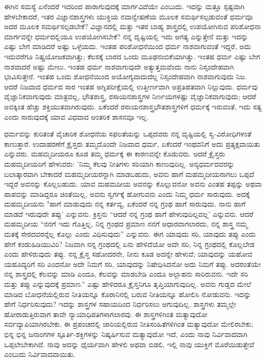 ಈಗಿನ ಸಮಸ್ಯೆ ಏನೆಂದರೆ ಇದರಿಂದ ಪಾರಾಗುವುದಕ್ಕೆ ಮಾರ್ಗವಿದೆಯೇ ಎಂಬುದು. ಇದನ್ನು ಮತ್ತೂ ಸ್ಪಷ್ಟವಾಗಿ ಹೇಳಬೇಕಾದರೆ, ಇತರ ವಿಜ್ಞಾನಶಾಸ್ತ್ರಗಳು ಯುಕ್ತಿಯ ನವಾನ್ವೇಷಣೆಯ ಮೂಲಕ ಸಮರ್ಥಿಸಲ್ಪಡುವಂತೆ ಧರ್ಮವೂ ಅದರ ಮೂಲಕ ಸಮರ್ಥಿಸಲ್ಪಡಬೇಕೆ? ವಿಜ್ಞಾನದಲ್ಲಿ ಮತ್ತು ಇತರ ಬಾಹ್ಯ ಶಾಸ್ತ್ರದಲ್ಲಿ ಉಪಯೋಗಿಸುವ ಪರಿಶೋಧನಾ ಮಾರ್ಗವನ್ನೇ ಧರ್ಮದಲ್ಲಿಯೂ ಉಪಯೋಗಿಸಬೇಕೆ? ನನ್ನ ದೃಷ್ಟಿಯಲ್ಲಿ ಇದು ಅಗತ್ಯ ಎನ್ನುತ್ತೇನೆ ಮತ್ತು ಇದನ್ನು ಎಷ್ಟು ಬೇಗ ಮಾಡಿದರೆ ಅಷ್ಟು ಒಳ್ಳೆಯದು. ಇಂತಹ ಪರಿಶೋಧನೆಯಿಂದ ಧರ್ಮ ನಾಶವಾಗುವಂತೆ ಇದ್ದರೆ, ಅದು ಇದುವರೆಗೂ ನಿಷ್ಪ್ರಯೋಜಕವಾಗಿತ್ತು; ಕೆಲಸಕ್ಕೆ ಬಾರದ ಒಂದು ಮೂಢನಂಬಿಕೆಯಾಗಿತ್ತು. ಇಂತಹ ಧರ್ಮ ಎಷ್ಟು ಬೇಗ ನಾಶವಾದರೆ ಅಷ್ಟು ಮೇಲು. ಇಂತಹ ಧರ್ಮ ನಾಶವಾಗುವುದೇ ಅತ್ಯುತ್ತಮವೆಂದು ನಾನು ನಿಸ್ಸಂದೇಹವಾಗಿ ಭಾವಿಸುತ್ತೇನೆ. ಇಂತಹ ಒಂದು ಶೋಧನೆಯಿಂದ ಅಯೋಗ್ಯವಾದುದೆಲ್ಲ ನಿಸ್ಸಂದೇಹವಾಗಿ ನಾಶವಾಗುವುದು ನಿಜ. ಆದರೆ ನಿಜವಾದ ಧರ್ಮದ ಸಾರ ಇಂತಹ ಅಗ್ನಿಪರೀಕ್ಷೆಯಲ್ಲಿ ಉತ್ತೀರ್ಣವಾಗಿ ಅಪ್ರತಿಹತವಾಗಿ ನಿಲ್ಲುವುದು. ಧರ್ಮವು ವೈಜ್ಞಾನಿಕವಾಗುವುದು ಮಾತ್ರವಲ್ಲ, ಭೌತಶಾಸ್ತ್ರ, ರಸಾಯನಶಾಸ್ತ್ರಗಳ ನಿರ್ಣಯಗಳಷ್ಟು ವೈಜ್ಞಾನಿಕವಾಗುವುದು; ಆದರೆ ಅವಕ್ಕಿಂತ ಹೆಚ್ಚು ಶಕ್ತಿಯುತವಾಗಿರುವುದು. ಏಕೆಂದರೆ ರಸಾಯನಶಾಸ್ತ್ರಭೌತಶಾಸ್ತ್ರಗಳಿಗೆ ಧರ್ಮಕ್ಕೆ ಇರುವಂತೆ, ಇದು ಸತ್ಯ ಎಂದು ಸಾರುವುದಕ್ಕೆ ಯಾವ ವಿಧವಾದ ಆಂತರಿಕ ಶಾಸನವೂ ಇಲ್ಲ.

ಧರ್ಮವನ್ನು ಕುರಿತಂತೆ ವೈಚಾರಿಕ ಶೋಧನೆಯ ಸಫಲತೆಯನ್ನು ಒಪ್ಪದವರು ನನ್ನ ದೃಷ್ಟಿಯಲ್ಲಿ ಸ್ವ-ವಿರೋಧಿಗಳಂತೆ ಕಾಣುತ್ತಾರೆ. ಉದಾಹರಣೆಗೆ ಕ್ರೈಸ್ತರು ತಮ್ಮದೊಂದೇ ನಿಜವಾದ ಧರ್ಮ, ಏಕೆಂದರೆ ಇಂಥವನಿಗೆ ಅದು ಪ್ರತ್ಯಕ್ಷವಾಯಿತು ಎನ್ನುವರು. ಮಹಮ್ಮದೀಯರೂ ಕೂಡ ತಮ್ಮ ಧರ್ಮಕ್ಕೆ ಈ ಕಾರಣವನ್ನೇ ಕೊಡುವರು. ಆದರೆ ಕ್ರೈಸ್ತರು ಮಹಮ್ಮದೀಯರಿಗೆ ಹೇಳುವರು: 'ನಿಮ್ಮ ಕೆಲವು ನೀತಿಗಳು ಸರಿಯಾಗಿ ಕಾಣುವುದಿಲ್ಲ. ಅನ್ಯಧರ್ಮದವರನ್ನು ಬಲಾತ್ಕಾರವಾಗಿ ಬೇಕಾದರೆ ಮಹಮ್ಮದೀಯರನ್ನಾಗಿ ಮಾಡಬಹುದು, ಅವನು ಹಾಗೆ ಮಹಮ್ಮದೀಯನಾಗಲು ಒಪ್ಪದೆ ಇದ್ದರೆ ಅವನನ್ನು ಕೊಲ್ಲಬಹುದು. ಯಾವ ಮಹಮದೀಯ ಅವನನ್ನು ಕೊಲ್ಲುವನೋ ಅವನು ಎಂತಹ ತಪ್ಪನ್ನು ಅಥವಾ ಪಾಪವನ್ನು ಮಾಡಿದ್ದರೂ ಚಿಂತೆಯಿಲ್ಲ, ಅವನು ಸ್ವರ್ಗಕ್ಕೆ ಹೋಗುವನು ಎಂದು ನಿಮ್ಮ ಧರ್ಮ ಸಾರುವುದು. ಅದಕ್ಕೆ ಮಹಮ್ಮದೀಯನು "ಹಾಗೆ ಮಾಡುವುದು ನನ್ನ ಕರ್ತವ್ಯ, ಏಕೆಂದರೆ ನನ್ನ ಗ್ರಂಥ ಹಾಗೆ ಸಾರುವುದು. ನಾನು ಹಾಗೆ ಮಾಡದೆ ಇರುವುದೇ ತಪ್ಪು' ಎನ್ನುವನು. ಕ್ರಿಸ್ತನು “ಆದರೆ ನನ್ನ ಗ್ರಂಥ ಹಾಗೆ ಹೇಳುವುದಿಲ್ಲವಲ್ಲ' ಎನ್ನುವನು. ಆದರೆ ಮಹಮ್ಮದೀಯ “ನನಗೆ ಇದು ಗೊತ್ತಿಲ್ಲ, ನಿನ್ನ ಗ್ರಂಥದ ಪ್ರಮಾಣ ನನಗೆ ಆಧಾರವಾಗಲಾರದು, ನನ್ನ ಶಾಸ್ತ್ರ ನಮ್ಮ ಮತಕ್ಕೆ ಸೇರದವರನ್ನೆಲ್ಲ ಕೊಲ್ಲು ಎಂದು ವಿಧಿಸುವುದು'' ಎನ್ನುವನು. ಈಗ ಯಾವುದು ಸರಿ, ಯಾವುದು ತಪ್ಪು ಎಂದು ಹೇಗೆ ಕಂಡುಹಿಡಿಯುವಿರಿ? ನಿಜವಾಗಿ ನನ್ನ ಗ್ರಂಥದಲ್ಲಿ ಏನು ಹೇಳಿದೆಯೋ ಅದೇ ಸರಿ, ನಿನ್ನ ಗ್ರಂಥದಲ್ಲಿ ಕೊಲ್ಲಬೇಡ ಎಂದು ಹೇಳಿರುವುದು ತಪ್ಪು. ನನ್ನ ಕ್ರೈಸ್ತ ಸಹೋದರನೇ, ನೀನು ಕೂಡ ಅದನ್ನೇ ಹೇಳುವೆ; ಯಾವುದನ್ನು ಯಹೋವ ಯಹೂದ್ಯರಿಗೆ ಸರಿ ಎಂದನೋ ಅದೇ ನಿಮಗೆ ಸರಿ, ಯಾವುದನ್ನು ನಿಷೇಧಿಸಿದನೋ ಅದು ನಿಮಗೆ ತಪ್ಪು. ಅದರಂತೆಯೇ ನನ್ನ ಶಾಸ್ತ್ರದಲ್ಲಿ ಕೆಲವನ್ನು ಮಾಡಿ ಎಂದೂ, ಕೆಲವನ್ನು ಮಾಡಬೇಡಿ ಎಂದೂ ಅಲ್ಲಾಹನು ಸಾರಿರುವನು. ಇದೇ ಸರಿ ಮತ್ತು ತಪ್ಪು ಎನ್ನುವುದಕ್ಕೆ ಪ್ರಮಾಣ.” ಎಷ್ಟು ಹೇಳಿದರೂ ಕ್ರೈಸ್ತನಿಗೂ ತೃಪ್ತಿಯಾಗುವುದಿಲ್ಲ. ಅವನು ಗುಡ್ಡದ ಮೇಲೆ ಮಾಡಿದ ಬೋಧನೆಯಲ್ಲಿರುವ ನೀತಿಯನ್ನೂ ಕೊರಾನಿನಲ್ಲಿ ಬರುವ ನೀತಿಯನ್ನೂ ಹೋಲಿಸಿ ನೋಡುವನು. ಇದನ್ನು ಹೇಗೆ ನಿರ್ಧರಿಸುವುದು? ಇದನ್ನು ಶಾಸ್ತ್ರಗಳ ಸಹಾಯದಿಂದ ನಿರ್ಧರಿಸಲು ಆಗುವುದಿಲ್ಲ. ಶಾಸ್ತ್ರಗಳು ತಮ್ಮಲ್ಲೇ ಹೋರಾಡುತ್ತಿರುವಾಗ ತಾವೇ ನ್ಯಾಯಾಧಿಪತಿಗಳಾಗಲಾರವು. ಈ ಶಾಸ್ತ್ರಗಳಿಗಿಂತ ಮತ್ಯಾವುದೋ ಸರ್ವವ್ಯಾಪಿಯಾಗಿರಬೇಕು. ಈ ಪ್ರಪಂಚದಲ್ಲಿ ಜಾರಿಯಲ್ಲಿರುವ ನೀತಿಸಂಹಿತೆಗಳಿಗಿಂತ ಮತ್ಯಾವುದೋ ಮೇಲಿರಬೇಕು; ಭಿನ್ನ ಭಿನ್ನ ಜನಾಂಗಗಳ ಸ್ಪೂರ್ತಿ-ಶಕ್ತಿಗಳನ್ನು ನಿಷ್ಕರ್ಷಿಸುವ ಮತ್ಯಾವುದೋ ಇದೆ, ಎಂದು ನಾವು ನಿರ್ವಿವಾದವಾಗಿ ಒಪ್ಪಲೇಬೇಕಾಗಿದೆ. ನಾವು ಅದನ್ನು ಧೈರ್ಯವಾಗಿ ಹೇಳಲಿ ಅಥವಾ ಬಿಡಲಿ, ಇಲ್ಲಿ ನಾವು ಯುಕ್ತಿಗೆ ಮೊರೆಯಿಡುತ್ತೇವೆ ಎಂಬುದು ನಿರ್ವಿವಾದವಾಯಿತು.


